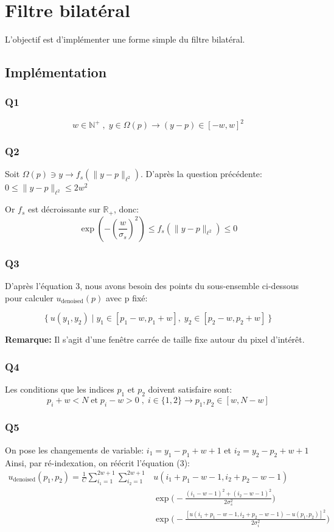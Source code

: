\documentclass{article}
\begin{document}
\section{Filtre bilatéral}
L'objectif est d'implémenter une forme simple du filtre bilatéral.
\subsection{Implémentation}
\subsubsection*{Q1}
$$w \in \mathbb{N}^+ \;, \; y \in \Omega(p) \rightarrow (y-p) \in {[{-w}, w]}^2$$
\subsubsection*{Q2}
Soit $\Omega(p) \ni y \rightarrow f_s(\parallel y-p \parallel_{\ell^2})$. 
D'après la question précédente: $ 0 \leq \parallel y-p \parallel_{\ell^2} \leq 2 w^2 $

Or $f_s$ est décroissante sur $\mathbb{R}_+$, donc: $$\exp(-(\frac{w}{\sigma_s})^2) \leq f_s(\parallel y-p \parallel_{\ell^2}) \leq 0 $$

\subsubsection*{Q3} D'après l'équation 3, nous avons besoin des points du sous-ensemble ci-dessous pour calculer $u_\text{denoised}(p)$ avec p fixé: 

$$\big \{ \: u(y_1, y_2) \;|\; y_1 \in {[p_1 - w, p_1 + w]}, \; y_2 \in {[p_2 - w, p_2 + w]}\: \big \}  $$

\textbf{Remarque: } Il s'agit d'une fenêtre carrée de taille fixe autour du pixel d'intérêt.
\subsubsection*{Q4}
Les conditions que les indices $p_1$ et $p_2$ doivent satisfaire sont:
 $$p_i + w < N \;\text{et}\; p_i - w > 0 \;,\; i \in \{1, 2\} \rightarrow p_1, p_2 \in {[w, N-w]}$$
\subsubsection*{Q5}
On pose les changements de variable: $i_1 = y_1 - p_1 + w + 1$ et $i_2 = y_2 - p_2 + w + 1$
Ainsi, par ré-indexation, on réécrit l'équation (3):
\begin{equation*}\begin{split}
u_\text{denoised}(p_1, p_2) = \frac{1}{C} \displaystyle\sum_{i_1 = 1}^{2w + 1}
\displaystyle\sum_{i_2 = 1}^{2w + 1} & u(i_1+p_1 - w - 1, i_2 + p_2 - w - 1) \\
& \exp{ \big ( - \frac{(i_1 - w - 1)^2 + (i_2 -w -1)^2 }{2\sigma_s^2} \big )} \\
& \exp{ \big ( - \frac{[u(i_1 + p_1 - w - 1, i_2 + p_2 - w - 1) - u(p_1, p_2)]^2}{2\sigma_i^2} \big )}
\end{split}\end{equation*}
\end{document}
